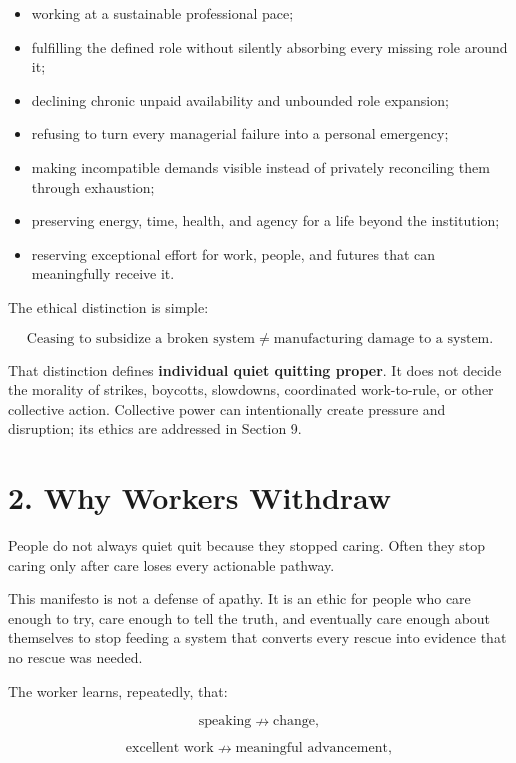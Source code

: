 \documentclass[11pt,oneside]{article}
\providecommand{\tightlist}{%
  \setlength{\itemsep}{0.22em}\setlength{\parskip}{0pt}}
\begin{document}
\begin{itemize}
\tightlist
\item
  working at a sustainable professional pace;
\item
  fulfilling the defined role without silently absorbing every missing
  role around it;
\item
  declining chronic unpaid availability and unbounded role expansion;
\item
  refusing to turn every managerial failure into a personal emergency;
\item
  making incompatible demands visible instead of privately reconciling
  them through exhaustion;
\item
  preserving energy, time, health, and agency for a life beyond the
  institution;
\item
  reserving exceptional effort for work, people, and futures that can
  meaningfully receive it.
\end{itemize}

The ethical distinction is simple:

\[
\boxed{\text{Ceasing to subsidize a broken system} \neq \text{manufacturing damage to a system}.}
\]

That distinction defines \textbf{individual quiet quitting proper}. It
does not decide the morality of strikes, boycotts, slowdowns,
coordinated work-to-rule, or other collective action. Collective power
can intentionally create pressure and disruption; its ethics are
addressed in Section 9.

\hypertarget{why-workers-withdraw}{%
\section{2. Why Workers Withdraw}\label{why-workers-withdraw}}

People do not always quiet quit because they stopped caring. Often they
stop caring only after care loses every actionable pathway.

This manifesto is not a defense of apathy. It is an ethic for people who
care enough to try, care enough to tell the truth, and eventually care
enough about themselves to stop feeding a system that converts every
rescue into evidence that no rescue was needed.

The worker learns, repeatedly, that:

\[
\text{speaking} \nrightarrow \text{change},
\]

\[
\text{excellent work} \nrightarrow \text{meaningful advancement},
\]
\end{document}
